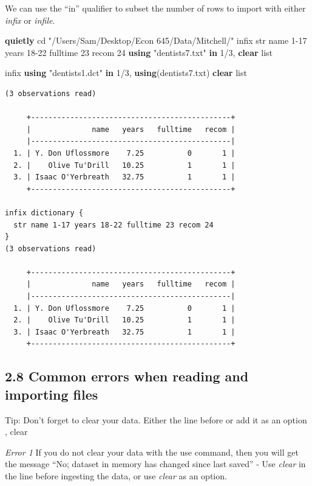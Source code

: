 \documentclass[
]{book}
\newenvironment{Shaded}{\begin{snugshade}}{\end{snugshade}}
\newcommand{\BaseNTok}[1]{\textcolor[rgb]{0.00,0.00,0.81}{#1}}
\newcommand{\KeywordTok}[1]{\textcolor[rgb]{0.13,0.29,0.53}{\textbf{#1}}}
\newcommand{\NormalTok}[1]{#1}
\newcommand{\OtherTok}[1]{\textcolor[rgb]{0.56,0.35,0.01}{#1}}
\newcommand{\StringTok}[1]{\textcolor[rgb]{0.31,0.60,0.02}{#1}}
\begin{document}
We can use the ``in'' qualifier to subset the number of rows to import with either \emph{infix} or \emph{infile}.

\begin{Shaded}
\begin{Highlighting}[]
\KeywordTok{quietly}\NormalTok{ cd }\StringTok{"/Users/Sam/Desktop/Econ 645/Data/Mitchell/"}
\NormalTok{infix str }\BaseNTok{name}\NormalTok{ 1{-}17 years 18{-}22 fulltime 23 recom 24 }\KeywordTok{using} \StringTok{"dentists7.txt"} \KeywordTok{in}\NormalTok{ 1/3, }\KeywordTok{clear}
\OtherTok{list}

\NormalTok{infix }\KeywordTok{using} \StringTok{"dentists1.dct"} \KeywordTok{in}\NormalTok{ 1/3, }\KeywordTok{using}\NormalTok{(dentists7.txt) }\KeywordTok{clear}
\OtherTok{list}
\end{Highlighting}
\end{Shaded}

\begin{verbatim}
(3 observations read)

     +----------------------------------------------+
     |              name   years   fulltime   recom |
     |----------------------------------------------|
  1. | Y. Don Uflossmore    7.25          0       1 |
  2. |    Olive Tu'Drill   10.25          1       1 |
  3. | Isaac O'Yerbreath   32.75          1       1 |
     +----------------------------------------------+

infix dictionary {
  str name 1-17 years 18-22 fulltime 23 recom 24
}
(3 observations read)

     +----------------------------------------------+
     |              name   years   fulltime   recom |
     |----------------------------------------------|
  1. | Y. Don Uflossmore    7.25          0       1 |
  2. |    Olive Tu'Drill   10.25          1       1 |
  3. | Isaac O'Yerbreath   32.75          1       1 |
     +----------------------------------------------+
\end{verbatim}

\subsection{2.8 Common errors when reading and importing files}\label{common-errors-when-reading-and-importing-files}

Tip: Don't forget to clear your data.
Either the line before or add it as an option , clear

\emph{Error 1}
If you do not clear your data with the use command, then you will get the message ``No; dataset in memory has changed since last saved'' - Use \emph{clear} in the line before ingesting the data, or use \emph{clear} as an option.
\end{document}
